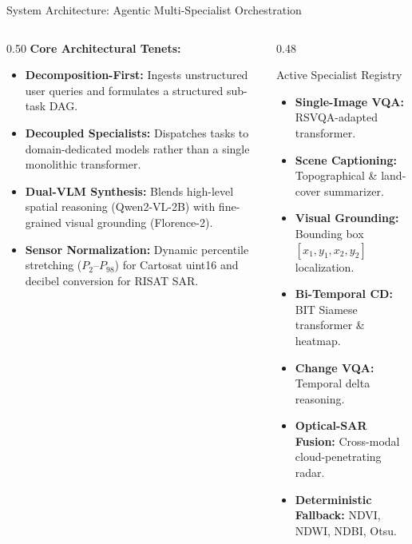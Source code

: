 \documentclass[aspectratio=169, 10pt]{beamer}
\begin{document}
\begin{frame}{System Architecture: Agentic Multi-Specialist Orchestration}
  \vspace{-0.2em}
  \begin{columns}[T]
    \begin{column}{0.50\textwidth}
      \textbf{\color{IEEEDarkBlue}Core Architectural Tenets:}
      \begin{itemize}\setlength{\itemsep}{2.5pt}\small
        \item \textbf{Decomposition-First:} Ingests unstructured user queries and formulates a structured sub-task DAG.
        \item \textbf{Decoupled Specialists:} Dispatches tasks to domain-dedicated models rather than a single monolithic transformer.
        \item \textbf{Dual-VLM Synthesis:} Blends high-level spatial reasoning (Qwen2-VL-2B) with fine-grained visual grounding (Florence-2).
        \item \textbf{Sensor Normalization:} Dynamic percentile stretching ($P_2$--$P_{98}$) for Cartosat uint16 and decibel conversion for RISAT SAR.
      \end{itemize}
    \end{column}

    \begin{column}{0.48\textwidth}
      \begin{block}{\small Active Specialist Registry}
        \scriptsize
        \begin{itemize}\setlength{\itemsep}{2pt}
          \item \textbf{Single-Image VQA:} RSVQA-adapted transformer.
          \item \textbf{Scene Captioning:} Topographical \& land-cover summarizer.
          \item \textbf{Visual Grounding:} Bounding box $[x_1, y_1, x_2, y_2]$ localization.
          \item \textbf{Bi-Temporal CD:} BIT Siamese transformer \& heatmap.
          \item \textbf{Change VQA:} Temporal delta reasoning.
          \item \textbf{Optical-SAR Fusion:} Cross-modal cloud-penetrating radar.
          \item \textbf{Deterministic Fallback:} NDVI, NDWI, NDBI, Otsu.
        \end{itemize}
      \end{block}
    \end{column}
  \end{columns}
\end{frame}
\end{document}
